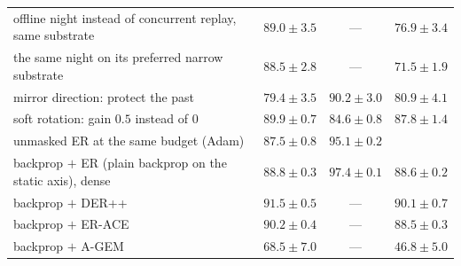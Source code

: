 \documentclass{article}
\begin{document}
\begin{table}[t]
\begin{tabular}{@{}lccc@{}}
\midrule
offline night instead of concurrent replay, same substrate & $89.0\pm3.5$ & --- & $76.9\pm3.4$ \\
\quad the same night on its preferred narrow substrate & $88.5\pm2.8$ & --- & $71.5\pm1.9$ \\
mirror direction: protect the past & $79.4\pm3.5$ & $90.2\pm3.0$ & $80.9\pm4.1$ \\
soft rotation: gain $0.5$ instead of $0$ & $89.9\pm0.7$ & $84.6\pm0.8$ & $87.8\pm1.4$ \\
\midrule
unmasked ER at the same budget (Adam) & $87.5\pm0.8$ & $95.1\pm0.2$ &  \\
backprop $+$ ER (plain backprop on the static axis), dense & $88.8\pm0.3$ & $97.4\pm0.1$ & $88.6\pm0.2$ \\
backprop $+$ DER++ & $91.5\pm0.5$ & --- & $90.1\pm0.7$ \\
backprop $+$ ER-ACE & $90.2\pm0.4$ & --- & $88.5\pm0.3$ \\
backprop $+$ A-GEM & $68.5\pm7.0$ & --- & $46.8\pm5.0$ \\
\bottomrule
\end{tabular}
\end{table}
\end{document}
